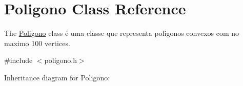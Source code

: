 \hypertarget{class_poligono}{}\section{Poligono Class Reference}
\label{class_poligono}


The \hyperlink{class_poligono}{Poligono} class é uma classe que representa poligonos convexos com no maximo 100 vertices.  




{\ttfamily \#include $<$poligono.\+h$>$}



Inheritance diagram for Poligono\+:
